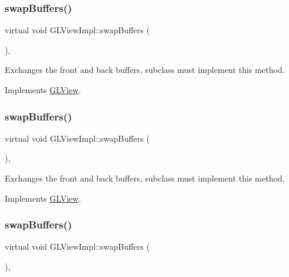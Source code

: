 \subsubsection{\texorpdfstring{swap\+Buffers()}{swapBuffers()}\hspace{0.1cm}{\footnotesize\ttfamily [5/9]}}
{\footnotesize\ttfamily virtual void G\+L\+View\+Impl\+::swap\+Buffers (\begin{DoxyParamCaption}{ }\end{DoxyParamCaption})\hspace{0.3cm}{\ttfamily [override]}, {\ttfamily [virtual]}}

Exchanges the front and back buffers, subclass must implement this method. 

Implements \hyperlink{classGLView_a8868ba73f19216f5f6c8dbcc1a7c9bb4}{G\+L\+View}.

\mbox{\label{classGLViewImpl_ab434675d26eb367ae74f9533c34d2ca7}} 
\subsubsection{\texorpdfstring{swap\+Buffers()}{swapBuffers()}\hspace{0.1cm}{\footnotesize\ttfamily [6/9]}}
{\footnotesize\ttfamily virtual void G\+L\+View\+Impl\+::swap\+Buffers (\begin{DoxyParamCaption}{ }\end{DoxyParamCaption})\hspace{0.3cm}{\ttfamily [override]}, {\ttfamily [virtual]}}

Exchanges the front and back buffers, subclass must implement this method. 

Implements \hyperlink{classGLView_a8868ba73f19216f5f6c8dbcc1a7c9bb4}{G\+L\+View}.

\mbox{\label{classGLViewImpl_ab434675d26eb367ae74f9533c34d2ca7}} 
\subsubsection{\texorpdfstring{swap\+Buffers()}{swapBuffers()}\hspace{0.1cm}{\footnotesize\ttfamily [7/9]}}
{\footnotesize\ttfamily virtual void G\+L\+View\+Impl\+::swap\+Buffers (\begin{DoxyParamCaption}{ }\end{DoxyParamCaption})\hspace{0.3cm}{\ttfamily [override]}, {\ttfamily [virtual]}}

